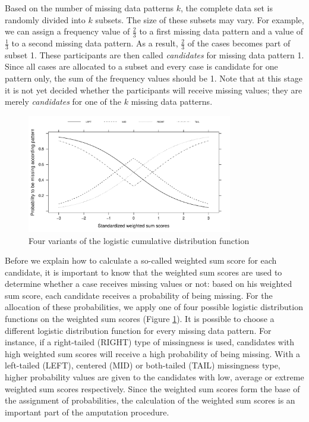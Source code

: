 \documentclass[11pt,a4paper]{article}
\begin{document}
Based on the number of missing data patterns $k$, the complete data set is randomly divided into $k$ subsets. The size of these subsets may vary. For example, we can assign a frequency value of $\frac{2}{3}$ to a first missing data pattern and a value of $\frac{1}{3}$ to a second missing data pattern. As a result, $\frac{2}{3}$ of the cases becomes part of subset 1. These participants are then called \textit{candidates} for missing data pattern 1. Since all cases are allocated to a subset and every case is candidate for one pattern only, the sum of the frequency values should be 1. Note that at this stage it is not yet decided whether the participants will receive missing values; they are merely \textit{candidates} for one of the $k$ missing data patterns. 

\begin{figure}[t!]
\centering
\includegraphics[width=0.8\textwidth]{Figures/types.pdf}
\caption{\small Four variants of the logistic cumulative distribution function}
\label{types}
\end{figure}

Before we explain how to calculate a so-called weighted sum score for each candidate, it is important to know that the weighted sum scores are used to determine whether a case receives missing values or not: based on his weighted sum score, each candidate receives a probability of being missing. For the allocation of these probabilities, we apply one of four possible logistic distribution functions on the weighted sum scores (Figure \ref{types}). It is possible to choose a different logistic distribution function for every missing data pattern. For instance, if a right-tailed (RIGHT) type of missingness is used, candidates with high weighted sum scores will receive a high probability of being missing. With a left-tailed (LEFT), centered (MID) or both-tailed (TAIL) missingness type, higher probability values are given to the candidates with low, average or extreme weighted sum scores respectively. Since the weighted sum scores form the base of the assignment of probabilities, the calculation of the weighted sum scores is an important part of the amputation procedure. 
\end{document}
